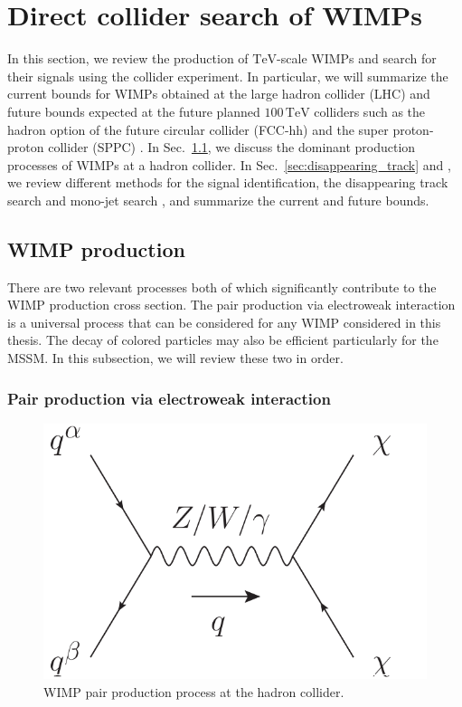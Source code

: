 \documentclass[12pt,twoside,book]{article}
\begin{document}
\section{Direct collider search of WIMPs}
\setcounter{equation}{0}
\label{sec:direct}

\vskip 0.1in

In this section, we review the production of $\mathrm{TeV}$-scale WIMPs and search for their signals using the collider experiment.
In particular, we will summarize the current bounds for WIMPs obtained at the large hadron collider (LHC) and future bounds expected at the future planned $100\,\mathrm{TeV}$ colliders such as the hadron option of the future circular collider (FCC-hh) \cite{Benedikt:2651300} and the super proton-proton collider (SPPC) \cite{CEPC-SPPCStudyGroup:2015csa, CEPC-SPPCStudyGroup:2015esa}.
In Sec.~\ref{sec:wimp_production}, we discuss the dominant production processes of WIMPs at a hadron collider.
In Sec.~\ref{sec:disappearing_track} and , we review  different methods for the signal identification, the disappearing track search and mono-jet search , and summarize the current and future bounds.


\subsection{WIMP production}
\label{sec:wimp_production}

There are two relevant processes both of which significantly contribute to the WIMP production cross section.
The pair production via electroweak interaction is a universal process that can be considered for any WIMP considered in this thesis.
The decay of colored particles may also be efficient particularly for the MSSM.
In this subsection, we will review these two in order.


\subsubsection*{Pair production via electroweak interaction}

\begin{figure}[b]
  \centering
  \includegraphics[width=0.4\hsize]{WIMP_production.pdf}
  \caption{WIMP pair production process at the hadron collider.}
  \label{fig:wimp_production}
\end{figure}
\end{document}
